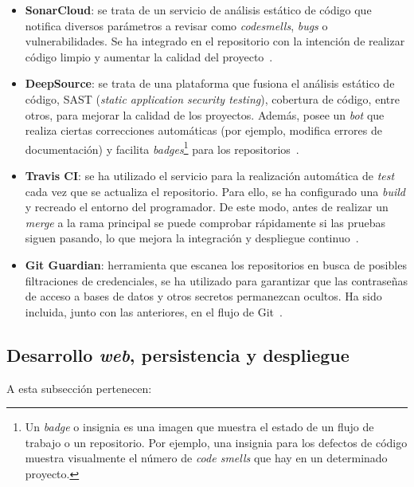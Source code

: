 \begin{itemize}
	\item \textbf{SonarCloud}: se trata de un servicio de análisis estático de código que notifica diversos parámetros a revisar como \textit{codesmells}, \textit{bugs} o vulnerabilidades. Se ha integrado en el repositorio con la intención de realizar código limpio y aumentar la calidad del proyecto~\cite{sonarCloud}.
	\item \textbf{DeepSource}: se trata de una plataforma que fusiona el análisis estático de código, SAST (\textit{static application security testing}), cobertura de código, entre otros, para mejorar la calidad de los proyectos. Además, posee un \textit{bot} que realiza ciertas correcciones automáticas (por ejemplo, modifica errores de documentación) y facilita \textit{badges}\footnote{Un \textit{badge} o insignia es una imagen que muestra el estado de un flujo de trabajo o un repositorio. Por ejemplo, una insignia para los defectos de código muestra visualmente el número de \textit{code smells} que hay en un determinado proyecto.} para los repositorios~\cite{deepSourceBot}.
	\item \textbf{Travis CI}: se ha utilizado el servicio para la realización automática de \textit{test} cada vez que se actualiza el repositorio. Para ello, se ha configurado una \textit{build} y recreado el entorno del programador. De este modo, antes de realizar un \textit{merge} a la rama principal se puede comprobar rápidamente si las pruebas siguen pasando, lo que mejora la integración y despliegue continuo~\cite{travisCI}.
	\item \textbf{Git Guardian}: herramienta que escanea los repositorios en busca de posibles filtraciones de credenciales, se ha utilizado para garantizar que las contraseñas de acceso a bases de datos y otros secretos permanezcan ocultos. Ha sido incluida, junto con las anteriores, en el flujo de Git~\cite{gitGuardian}.
\end{itemize}

\subsection{Desarrollo \textit{web}, persistencia y despliegue}
\label{sec:despliegue}

A esta subsección pertenecen:


